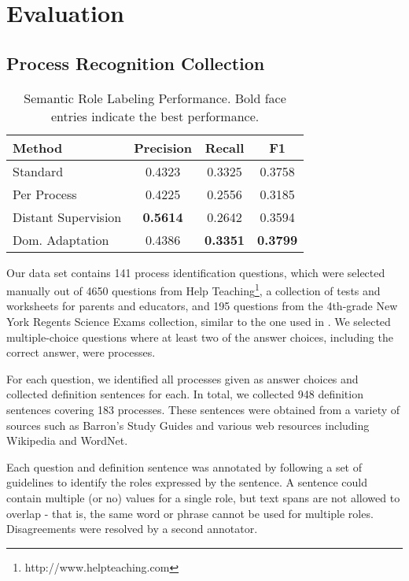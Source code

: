 \section{Evaluation}

\subsection{Process Recognition Collection}
\begin{table*}[htdp]
\begin{center}
\begin{tabular}{|l|c|c|c|}
\hline
Method			& 	Precision	&	Recall	&	F1\\
\hline
Standard			& 	0.4323	& 	0.3325	&	0.3758\\
Per Process		&	0.4225	& 	0.2556	& 	0.3185\\
Distant Supervision 	& 	{\bf 0.5614}	& 	0.2642	& 	0.3594 \\
Dom. Adaptation	& 	0.4386	& 	{\bf 0.3351}	& 	{\bf 0.3799}\\
\hline
\end{tabular}
\end{center}
\caption{Semantic Role Labeling Performance. Bold face entries indicate the best performance.}
\label{tab:srl-results}
\end{table*}%

Our data set contains 141 process identification questions, which were selected manually out of 4650 questions from Help Teaching\footnote{http://www.helpteaching.com}, a collection of tests and worksheets for parents and educators, and 195 questions from the 4th-grade New York Regents Science Exams collection, similar to the one used in \cite{clark2013study}. We selected multiple-choice questions where at least two of the answer choices, including the correct answer, were processes.

For each question, we identified all processes given as answer choices and collected definition sentences for each. In total, we collected 948 definition sentences covering 183 processes. These sentences were obtained from a variety of sources such as Barron's Study Guides and various web resources including Wikipedia and WordNet.

Each question and definition sentence was annotated by following a set of guidelines to identify the roles expressed by the sentence. A sentence could contain multiple (or no) values for a single role, but text spans are not allowed to overlap - that is, the same word or phrase cannot be used for multiple roles. Disagreements were resolved by a second annotator.

